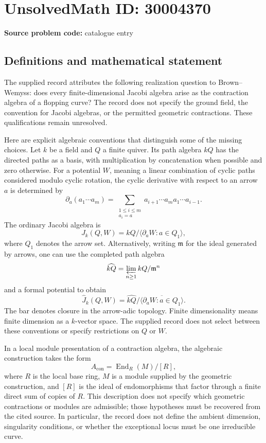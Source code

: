 \documentclass[11pt]{article}
\begin{document}
\section*{UnsolvedMath ID: 30004370}
\textbf{Source problem code:} catalogue entry
\subsection{Definitions and mathematical statement}
The supplied record attributes the following realization question to Brown--Wemyss: does every finite-dimensional Jacobi algebra arise as the contraction algebra of a flopping curve? The record does not specify the ground field, the convention for Jacobi algebras, or the permitted geometric contractions. These qualifications remain unresolved.

Here are explicit algebraic conventions that distinguish some of the missing choices. Let \(k\) be a field and \(Q\) a finite quiver. Its path algebra \(kQ\) has the directed paths as a basis, with multiplication by concatenation when possible and zero otherwise. For a potential \(W\), meaning a linear combination of cyclic paths considered modulo cyclic rotation, the cyclic derivative with respect to an arrow \(a\) is determined by
\[
\partial_a(a_1\cdots a_m)
 =\sum_{\substack{1\leq i\leq m\\a_i=a}}
 a_{i+1}\cdots a_m a_1\cdots a_{i-1}.
\]
The ordinary Jacobi algebra is
\[
J_k(Q,W)=kQ/\langle\partial_aW:a\in Q_1\rangle,
\]
where \(Q_1\) denotes the arrow set. Alternatively, writing \(\mathfrak m\) for the ideal generated by arrows, one can use the completed path algebra
\[
\widehat{kQ}=\varprojlim_{n\geq1}kQ/\mathfrak m^n
\]
and a formal potential to obtain
\[
\widehat J_k(Q,W)=\widehat{kQ}/\overline{\langle\partial_aW:a\in Q_1\rangle}.
\]
The bar denotes closure in the arrow-adic topology. Finite dimensionality means finite dimension as a \(k\)-vector space. The supplied record does not select between these conventions or specify restrictions on \(Q\) or \(W\).

In a local module presentation of a contraction algebra, the algebraic construction takes the form
\[
A_{\mathrm{con}}=\operatorname{End}_R(M)/[R],
\]
where \(R\) is the local base ring, \(M\) is a module supplied by the geometric construction, and \([R]\) is the ideal of endomorphisms that factor through a finite direct sum of copies of \(R\). This description does not specify which geometric contractions or modules are admissible; those hypotheses must be recovered from the cited source. In particular, the record does not define the ambient dimension, singularity conditions, or whether the exceptional locus must be one irreducible curve.
\end{document}
